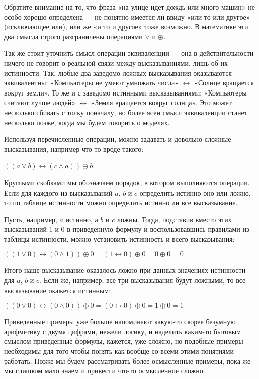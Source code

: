 Обратите внимание на то, что фраза «на улице идет дождь или много машин» не особо хорошо определена — не понятно имеется ли ввиду «или то или другое» (исключающее или), или же «и то и другое» тоже возможно. В математике эти два смысла строго разграничены операциями $\vee$ и $\oplus$.

Так же стоит уточнить смысл операции эквиваленции — она в действительности ничего не говорит о реальной связи между высказываниями, лишь об их истинности. Так, любые два заведомо ложных высказывания оказываются эквивалентны: «Компьютеры не умеют умножать числа» $\leftrightarrow$ «Солнце вращается вокруг земли». То же и с заведомо истинными высказываниями: «Компьютеры считают лучше людей» $\leftrightarrow$ «Земля вращается вокруг солнца». Это может несколько сбивать с толку поначалу, но более ясен смысл эквиваленции станет несколько позже, когда мы будем говорить о моделях.

Используя перечисленные операции, можно задавать и довольно сложные высказывания, например что-то вроде такого:

$((a \vee b) \leftrightarrow (c \wedge a)) \oplus b$.

Круглыми скобками мы обозначаем порядок, в котором выполняются операции. Если для каждого из высказываний $a$, $b$ и $c$ определить истинно оно или ложно, то по таблице истинности можно определить истинно ли все высказывание.

Пусть, например, $a$ истинно, а $b$ и $c$ ложны. Тогда, подставив вместо этих высказываний $1$ и $0$ в приведенную формулу и воспользовавшись правилами из таблицы истинности, можно установить истинность и всего высказывания:

$((1 \vee 0) \leftrightarrow (0 \wedge 1)) \oplus 0 = (1 \leftrightarrow 0) \oplus 0 = 0 \oplus 0 = 0$

Итого наше высказывание оказалось ложно при данных значениях истинности для $a$, $b$ и $c$. Если же, например, все три высказывания будут ложными, то все высказывание окажется истинным:

$((0 \vee 0) \leftrightarrow (0 \wedge 0)) \oplus 0 = (0 \leftrightarrow 0) \oplus 0 = 1 \oplus 0 = 1$

Приведенные примеры уже больше напоминают какую-то скорее безумную арифметику с двумя цифрами, нежели логику, и наделить каким-то бытовым смыслом приведенные формулы, кажется, уже сложно, но подобные примеры необходимы для того чтобы понять как вообще со всеми этими понятиями работать. Позже мы будем рассматривать более осмысленные примеры, пока же мы слишком мало знаем и привести что-то осмысленное сложно.

